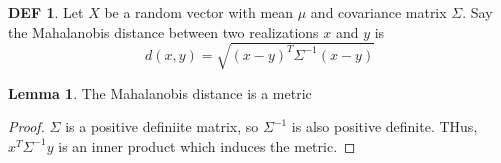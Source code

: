 \documentclass{article}
\theoremstyle{definition}\newtheorem{definition}{DEF}
\theoremstyle{lemma}\newtheorem{lemma}{Lemma}
\theoremstyle{corrolary}\newtheorem{corrolary}{Cor}
\begin{document}
\begin{definition}
Let $X$ be a random vector with mean $\mu$ and covariance matrix $\Sigma$.
Say the Mahalanobis distance between two realizations $x$ and $y$ is
\begin{equation}
d(x,y)=\sqrt{(x-y)^T\Sigma^{-1}(x-y)}
\end{equation}
\end{definition}

\begin{lemma}
The Mahalanobis distance is a metric
\end{lemma}
\begin{proof}
$\Sigma$ is a positive definiite matrix, so $\Sigma^{-1}$ is also positive definite.
THus, $x^T \Sigma^{-1}y$ is an inner product which induces the metric.
\end{proof}
\end{document}
